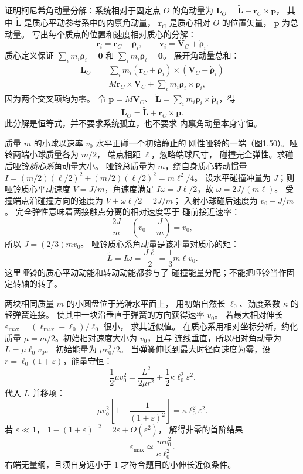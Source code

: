 证明柯尼希角动量分解：系统相对于固定点 $O$ 的角动量为
$\bm L_O=\widetilde{\bm L}+\bm r_C\times\bm p$，
其中 $\widetilde{\bm L}$ 是质心平动参考系中的内禀角动量，
$\bm r_C$ 是质心相对 $O$ 的位置矢量，
$\bm p$ 为总动量。
\exsolution
写出每个质点的位置和速度相对质心的分解：
\[
\bm r_i=\bm r_C+\bm\rho_i,\qquad
\bm v_i=\bm V_C+\dot{\bm\rho}_i.
\]
质心定义保证
$\sum_i m_i\bm\rho_i=\bm0$ 和
$\sum_i m_i\dot{\bm\rho}_i=\bm0$。
展开角动量总和：
\[
\begin{aligned}
\bm L_O
&=\sum_i m_i(\bm r_C+\bm\rho_i)
\times(\bm V_C+\dot{\bm\rho}_i)\\
&=M\bm r_C\times\bm V_C+
\sum_i m_i\bm\rho_i\times\dot{\bm\rho}_i,
\end{aligned}
\]
因为两个交叉项均为零。
令 $\bm p=M\bm V_C$、
$\widetilde{\bm L}=
\sum_i m_i\bm\rho_i\times\dot{\bm\rho}_i$，得
\[
\boxed{\bm L_O=\widetilde{\bm L}+\bm r_C\times\bm p}.
\]
\excheck 此分解是恒等式，并不要求系统孤立，也不要求
内禀角动量本身守恒。

质量 $m$ 的小球以速率 $v_0$ 水平正碰一个初始静止的
刚性哑铃的一端（图1.50）。哑铃两端小球质量各为 $m/2$，
端点相距 $\ell$，忽略端球尺寸，
碰撞完全弹性。求碰后哑铃\emph{质心系}角动量大小。
\exsolution
哑铃总质量为 $m$，绕自身质心转动惯量
$I=(m/2)(\ell/2)^2+(m/2)(\ell/2)^2=m\ell^2/4$。
设水平碰撞冲量为 $J$；则哑铃质心平动速度
$V=J/m$，角速度满足
$I\omega=J\ell/2$，故
$\omega=2J/(m\ell)$。
受撞端点沿碰撞方向的速度为
$V+\omega\ell/2=2J/m$；
入射小球碰后速度为 $v_0-J/m$。
完全弹性意味着两接触点分离的相对速度等于
碰前接近速率：
\[
\frac{2J}{m}-\left(v_0-\frac Jm\right)=v_0,
\]
所以 $J=(2/3)mv_0$。
哑铃质心系角动量是该冲量对质心的矩：
\[
\boxed{\widetilde L=I\omega=\frac{J\ell}{2}
=\frac13m\ell v_0}.
\]
\excheck 这里哑铃的质心平动动能和转动动能都参与了
碰撞能量分配；不能把哑铃当作固定转轴的转子。

两块相同质量 $m$ 的小圆盘位于光滑水平面上，
用初始自然长 $\ell_0$、劲度系数 $\kappa$ 的轻弹簧连接。
使其中一块沿垂直于弹簧的方向获得速率 $v_0$。
若最大相对伸长 $\varepsilon_{\max}=
(\ell_{\max}-\ell_0)/\ell_0$ 很小，
求其近似值。
\exsolution
在质心系用相对坐标分析，约化质量
$\mu=m/2$。初始相对速度大小为 $v_0$，且与
连线垂直，所以相对角动量为
$L=\mu\ell_0v_0$。
初始能量为 $\mu v_0^2/2$。
当弹簧伸长到最大时径向速度为零，设
$r=\ell_0(1+\varepsilon)$，能量守恒：
\[
\frac12\mu v_0^2
=\frac{L^2}{2\mu r^2}
+\frac12\kappa\ell_0^2\varepsilon^2.
\]
代入 $L$ 并移项：
\[
\mu v_0^2\left[1-\frac1{(1+\varepsilon)^2}\right]
=\kappa\ell_0^2\varepsilon^2.
\]
若 $\varepsilon\ll1$，
$1-(1+\varepsilon)^{-2}=2\varepsilon+O(\varepsilon^2)$，
解得非零的首阶结果
\[
\boxed{\varepsilon_{\max}\simeq
\frac{m v_0^2}{\kappa\ell_0^2}}.
\]
\excheck 右端无量纲，且须自身远小于 $1$
才符合题目的小伸长近似条件。

